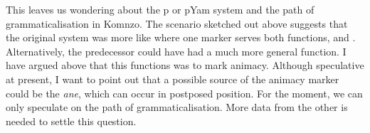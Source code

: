 This leaves us wondering about the p or pYam system and the path of grammaticalisation in Komnzo. The scenario sketched out above suggests that the original system was more like  where one  marker serves both functions,  and . Alternatively, the predecessor could have had a much more general function. I have argued above that this functions was to mark animacy. Although speculative at present, I want to point out that a possible source of the animacy marker could be the   \emph{ane}, which can occur in postposed position. For the moment, we can only speculate on the path of grammaticalisation. More data from the other  is needed to settle this question.